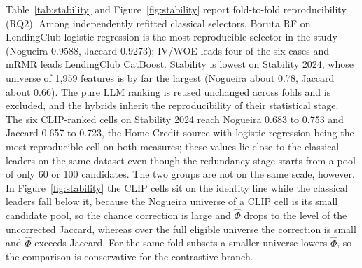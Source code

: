 \documentclass[final,5p,twocolumn]{elsarticle}
\begin{document}
Table~\ref{tab:stability} and Figure~\ref{fig:stability} report fold-to-fold reproducibility (RQ2). Among independently refitted classical selectors, Boruta RF on LendingClub logistic regression is the most reproducible selector in the study (Nogueira 0.9588, Jaccard 0.9273); IV/WOE leads four of the six cases and mRMR leads LendingClub CatBoost. Stability is lowest on Stability 2024, whose universe of 1,959 features is by far the largest (Nogueira about 0.78, Jaccard about 0.66). The pure LLM ranking is reused unchanged across folds and is excluded, and the hybrids inherit the reproducibility of their statistical stage. The six CLIP-ranked cells on Stability 2024 reach Nogueira 0.683 to 0.753 and Jaccard 0.657 to 0.723, the Home Credit source with logistic regression being the most reproducible cell on both measures; these values lie close to the classical leaders on the same dataset even though the redundancy stage starts from a pool of only 60 or 100 candidates. The two groups are not on the same scale, however. In Figure~\ref{fig:stability} the CLIP cells sit on the identity line while the classical leaders fall below it, because the Nogueira universe of a CLIP cell is its small candidate pool, so the chance correction is large and $\hat\Phi$ drops to the level of the uncorrected Jaccard, whereas over the full eligible universe the correction is small and $\hat\Phi$ exceeds Jaccard. For the same fold subsets a smaller universe lowers $\hat\Phi$, so the comparison is conservative for the contrastive branch.
\end{document}
